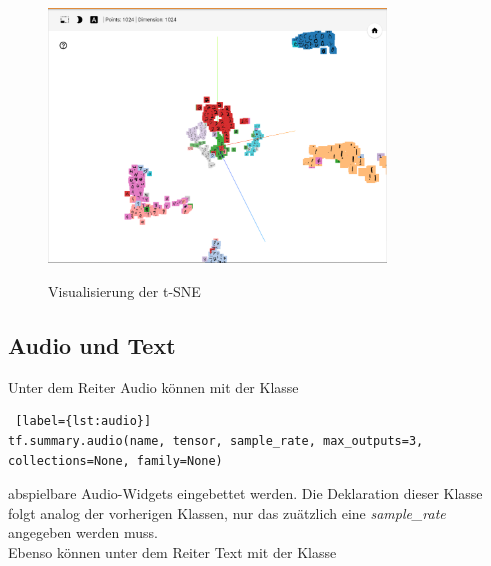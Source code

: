 \begin{itemize}
\begin{figure}[h!]
	\centering
	 \includegraphics[width=0.8\textwidth]{images/Kapitel_3/projektor_t-sne.png}\\
	\vspace{15pt} 
	\caption[Visualisierung der t-SNE]{Visualisierung der t-SNE}
	\label{fig:t-sne}
\end{figure}

\end{itemize}


\subsection{Audio und Text}

Unter dem Reiter Audio können mit der Klasse
\\

\begin{minipage}{\linewidth}
\begin{lstlisting} [label={lst:audio}]
tf.summary.audio(name, tensor, sample_rate, max_outputs=3, collections=None, family=None)
\end{lstlisting}
\end{minipage}
\vspace{0.2cm}

abspielbare Audio-Widgets eingebettet werden. Die Deklaration dieser Klasse folgt analog der vorherigen Klassen, nur das zuätzlich eine \textit{sample\_rate} angegeben werden muss.\\

Ebenso können unter dem Reiter Text mit der Klasse
\\


